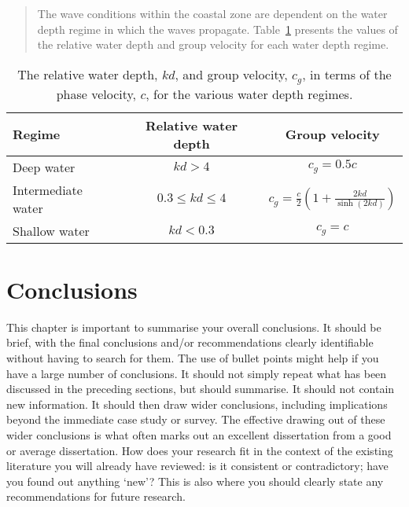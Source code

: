 \documentclass[a4paper,12pt]{article}
\begin{document}
\begin{quote}
  The wave conditions within the coastal zone are dependent on the water depth regime in which the
  waves propagate. Table~\ref{tab:water-depth-regimes} presents the values of the relative water
  depth and group velocity for each water depth regime.
\end{quote}

\begin{table}[!h] 
  \centering
    \begin{tabular}{| l | c | c |}
     \bf Regime              &  \bf Relative water depth           &  \bf Group velocity        \\
        \hline
         Deep water          &  $kd > 4$                       &  $c_g = 0.5c$  \\
         Intermediate water  &  $0.3\leqslant kd \leqslant 4$    &  $c_g=\frac{c}{2}\left( 1 + \frac{2kd}{\sinh{(2kd)}}\right)$  \\
         Shallow water       &  $kd < 0.3$                     &  $c_g = c$\\
    \end{tabular}
    \caption{The relative water depth, $kd$, and group velocity, $c_g$, in terms of the phase velocity, $c$, for the various water depth regimes.}
    \label{tab:water-depth-regimes}
\end{table}

\clearpage


\section{Conclusions}
\label{sec:conclusions}


This chapter is important to summarise your overall conclusions. It should be brief, with the final
conclusions and/or recommendations clearly identifiable without having to search for them. The use
of bullet points might help if you have a large number of conclusions. It should not simply repeat
what has been discussed in the preceding sections, but should summarise. It should not contain new information. It should then draw wider conclusions, including implications beyond the immediate case study or survey. The effective drawing out of these wider conclusions is what often marks out an excellent dissertation from a good or average dissertation. How does your research fit in the context of the existing literature you will already have reviewed: is it consistent or contradictory; have you found out anything `new'? This is also where you should clearly state any recommendations for future research.
\end{document}

